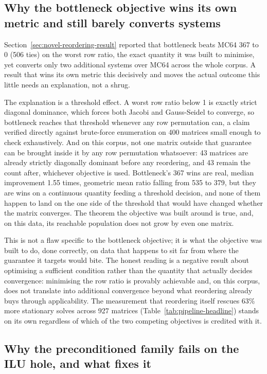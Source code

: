 \documentclass[11pt,a4paper]{article}
\begin{document}
\subsection{Why the bottleneck objective wins its own metric and still barely converts systems}
\label{sec:failure-bottleneck}

Section~\ref{sec:novel-reordering-result} reported that bottleneck beats MC64 367 to 0
(506 ties) on the worst row ratio, the exact quantity it was built to minimise, yet
converts only two additional systems over MC64 across the whole corpus. A result that wins
its own metric this decisively and moves the actual outcome this little needs an
explanation, not a shrug.

The explanation is a threshold effect. A worst row ratio below 1 is exactly strict
diagonal dominance, which forces both Jacobi and Gauss-Seidel to converge, so bottleneck
reaches that threshold whenever any row permutation can, a claim verified directly against
brute-force enumeration on 400 matrices small enough to check exhaustively. And on this
corpus, not one matrix outside that guarantee can be brought inside it by any row
permutation whatsoever: 43 matrices are already strictly diagonally dominant before any
reordering, and 43 remain the count after, whichever objective is used. Bottleneck's 367
wins are real, median improvement 1.55 times, geometric mean ratio falling from 535 to
379, but they are wins on a continuous quantity feeding a threshold decision, and none of
them happen to land on the one side of the threshold that would have changed whether the
matrix converges. The theorem the objective was built around is true, and, on this data,
its reachable population does not grow by even one matrix.

This is not a flaw specific to the bottleneck objective; it is what the objective was
built to do, done correctly, on data that happens to sit far from where the guarantee it
targets would bite. The honest reading is a negative result about optimising a sufficient
condition rather than the quantity that actually decides convergence: minimising the row
ratio is provably achievable and, on this corpus, does not translate into additional
convergence beyond what reordering already buys through applicability. The measurement
that reordering itself rescues 63\% more stationary solves across 927 matrices
(Table~\ref{tab:pipeline-headline}) stands on its own regardless of which of the two
competing objectives is credited with it.

\subsection{Why the preconditioned family fails on the ILU hole, and what fixes it}
\label{sec:failure-ilu}
\end{document}
